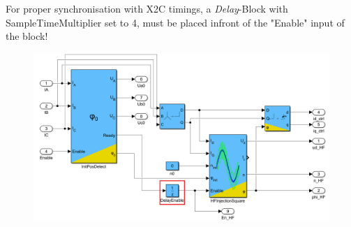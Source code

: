 %
%
%
%
%
For proper synchronisation with X2C timings, a \textit{Delay}-Block with SampleTimeMultiplier set to 4, must be placed infront of the "Enable" input of the block!
\begin{figure}[H]
	\includegraphics[width=\textwidth]{Subsystem_Sensorless_HF}
\end{figure}

